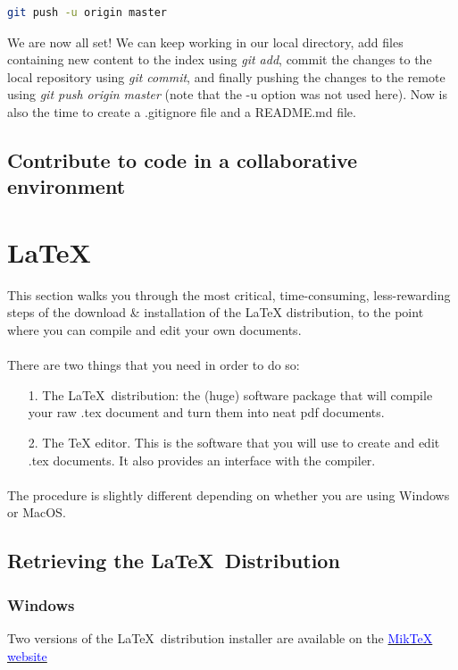 \documentclass{report}
\begin{document}
\begin{lstlisting}[language=bash, caption=Push the local repository to the remote ]
git push -u origin master
\end{lstlisting}

We are now all set! We can keep working in our local directory, add files containing new content to the index using \textit{git add}, commit the changes to the local repository using \textit{git commit}, and finally pushing the changes to the remote using \textit{git push origin master} (note that the -u option was not used here). Now is also the time to create a .gitignore file and a README.md file.
\subsection{Contribute to code in a collaborative environment}
\section{\LaTeX\ }


This section walks you through the most critical, time-consuming, less-rewarding steps of  the download \& installation of the LaTeX distribution, to the point where you can compile and edit your own documents. 
\paragraph{}
There are two things that you need in order to do so:
\begin{itemize}
\item[1.] The \LaTeX\ distribution: the (huge) software package that will compile your raw .tex document and turn them into  neat pdf documents.
\item[2.]  The TeX editor. This is the software that you will use to create and edit .tex documents. It also provides an interface with the compiler.
\end{itemize}
\paragraph{}
The procedure is slightly different depending on whether you are using Windows or MacOS.

\subsection*{Retrieving the \LaTeX\ Distribution }

\subsubsection*{Windows}
Two versions of the \LaTeX\ distribution installer are available on the  \href{http://www.miktex.org/download
}{\textcolor{blue}{MikTeX website}}
\end{document}

